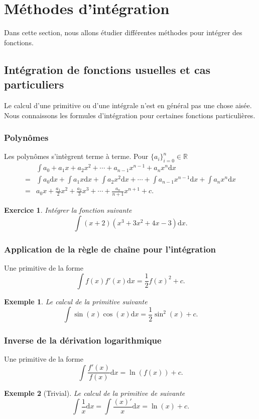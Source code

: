 \documentclass[a4paper,12pt]{book}
\newcommand{\real}{\mathbb{R}}
\newcommand{\dd}{\mathrm{d}}
\newtheorem*{exemple}{Exemple}
\newtheorem*{exercice}{Exercice}
\begin{document}
\section{Méthodes d'intégration}
Dans cette section, nous allons étudier différentes méthodes pour intégrer des fonctions.

\subsection{Intégration de fonctions usuelles et cas particuliers}
Le calcul d'une primitive ou d'une intégrale n'est en général pas une chose aisée. Nous connaissons les formules d'intégration
pour certaines fonctions particulières.
\subsubsection{Polynômes}
Les polynômes s'intègrent terme à terme. Pour $\{a_i\}_{i=0}^{n}\in\real$
\begin{align}
 &\int a_0 + a_1 x + a_2 x^2+\cdots+a_{n-1} x^{n-1}+a_{n} x^{n}\dd x\\
 =&\int a_0\dd x + \int a_1 x\dd x + \int a_2 x^2\dd x+\cdots+\int a_{n-1} x^{n-1}\dd x+\int a_{n} x^{n}\dd x\\
 =&a_0 x + \frac{a_1}{2}x^2+\frac{a_2}{3}x^3+\cdots+\frac{a_n}{n+1}x^{n+1}+c.
\end{align}
\begin{exercice}
 Intégrer la fonction suivante
 \begin{equation}
  \int (x+2)(x^3+3x^2+4x-3)\dd x.
 \end{equation}
\end{exercice}
\subsubsection{Application de la règle de chaîne pour l'intégration}
Une primitive de la forme
\begin{equation}
 \int f(x)f'(x)\dd x=\frac{1}{2}f(x)^2+c.
\end{equation}
\begin{exemple}
 Le calcul de la primitive suivante 
\begin{equation}
 \int \sin(x)\cos(x)\dd x=\frac{1}{2}\sin^2(x)+c.
\end{equation} 
\end{exemple}

\subsubsection{Inverse de la dérivation logarithmique}
Une primitive de la forme
\begin{equation}
 \int \frac{f'(x)}{f(x)}\dd x=\ln(f(x))+c.
\end{equation}
\begin{exemple}[Trivial]
 Le calcul de la primitive de suivante 
\begin{equation}
 \int \frac{1}{x}\dd x=\int \frac{(x)'}{x}\dd x=\ln(x)+c.
\end{equation} 
\end{exemple}
\end{document}
